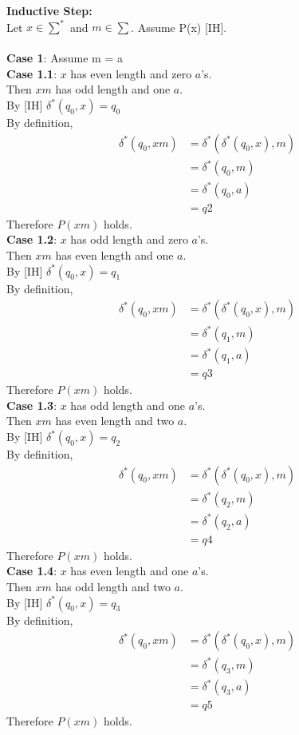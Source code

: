 \documentclass{article}
\begin{document}
\begin{enumerate}
	\textbf{Inductive Step:}\\
	Let $x \in \sum^*$ and $m \in \sum$. Assume P(x) [IH].\\\\
	\textbf{Case 1}: Assume m = a\\
	
	\textbf{Case 1.1}: $x$ has even length and zero $a$'s. \\
	Then $xm$ has odd length and one $a$.\\
	By [IH]  $\delta^*(q_0, x) = q_0$\\
	By definition,
	\begin{align*}
	\delta^*(q_0, xm) &= \delta^*(\delta^*(q_0, x), m)\\
	&= \delta^*(q_0, m)\\
	&= \delta^*(q_0, a) \\
	&= q2
	\end{align*}
	Therefore $P(xm)$ holds. \\
	
	\textbf{Case 1.2}: $x$ has odd length and zero $a$'s. \\
	Then $xm$ has even length and one $a$.\\
	By [IH]  $\delta^*(q_0, x) = q_1$\\
	By definition,
	\begin{align*}
	\delta^*(q_0, xm) &= \delta^*(\delta^*(q_0, x), m)\\
	&= \delta^*(q_1, m)\\
	&= \delta^*(q_1, a) \\
	&= q3
	\end{align*}
	Therefore $P(xm)$ holds. \\
	
	\textbf{Case 1.3}: $x$ has odd length and one $a$'s. \\
	Then $xm$ has even length and two $a$.\\
	By [IH]  $\delta^*(q_0, x) = q_2$\\
	By definition,
	\begin{align*}
	\delta^*(q_0, xm) &= \delta^*(\delta^*(q_0, x), m)\\
	&= \delta^*(q_2, m)\\
	&= \delta^*(q_2, a) \\
	&= q4
	\end{align*}
	Therefore $P(xm)$ holds. \\
	
	\textbf{Case 1.4}: $x$ has even length and one $a$'s. \\
	Then $xm$ has odd length and two $a$.\\
	By [IH]  $\delta^*(q_0, x) = q_3$\\
	By definition,
	\begin{align*}
	\delta^*(q_0, xm) &= \delta^*(\delta^*(q_0, x), m)\\
	&= \delta^*(q_3, m)\\
	&= \delta^*(q_3, a) \\
	&= q5
	\end{align*}
	Therefore $P(xm)$ holds. \\
	

\end{enumerate}
\end{document}
